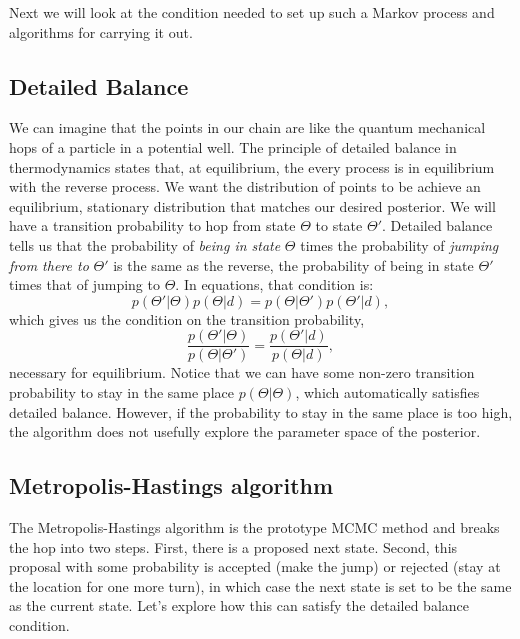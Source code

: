 Next we will look at the condition needed to set up such a Markov process and algorithms for carrying it out.

\subsection{Detailed Balance}
We can imagine that the points in our chain are like the quantum mechanical hops of a particle in a potential well.  The principle of detailed balance in thermodynamics states that, at equilibrium, the every process is in equilibrium with the reverse process.  We want the distribution of points to be achieve an equilibrium, stationary distribution that matches our desired posterior.  We will have a transition probability to hop from state $\Theta$ to state $\Theta'$.  Detailed balance tells us that the probability of \textit{being in state} $\Theta$ times the probability of \textit{jumping from there to} $\Theta'$ is the same as the reverse,  the probability of being in state $\Theta'$ times that of jumping to $\Theta$.  In equations, that condition is:
\begin{equation}
  p(\Theta'|\Theta) p(\Theta|d) =   p(\Theta|\Theta') p(\Theta'|d),
\end{equation}
which gives us the condition on the transition probability,
\begin{equation}
  \frac{p(\Theta'|\Theta)}{  p(\Theta|\Theta')}  =  \frac{p(\Theta'|d) }{p(\Theta|d)},
\end{equation}
necessary for equilibrium.  Notice that we can have some non-zero transition probability to stay in the same place $p(\Theta|\Theta)$, which automatically satisfies detailed balance.  However, if the probability to stay in the same place is too high, the algorithm does not usefully explore the parameter space of the posterior.


\subsection{Metropolis-Hastings algorithm}
The Metropolis-Hastings algorithm is the prototype MCMC method and breaks the hop into two steps.  First, there is a proposed next state.  Second, this proposal with some probability is accepted (make the jump)  or rejected (stay at the location for one more turn), in which case the next state is set to be the same as the current state.  Let's explore how this can satisfy the detailed balance condition.

